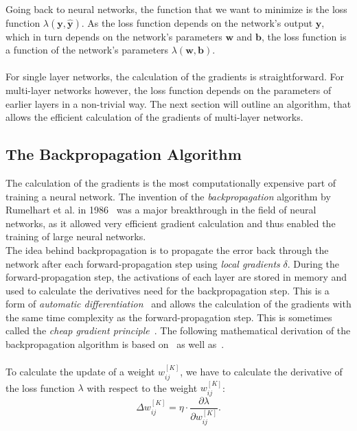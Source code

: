 Going back to neural networks, the function that we want to minimize is the loss function $\lambda(\bm{y}, \bm{\hat{y}})$.
As the loss function depends on the network's output $\bm{y}$, which in turn depends on the network's parameters $\bm{w}$ and $\bm{b}$, the loss function is a function of the network's parameters $\lambda(\bm{w}, \bm{b})$.
\\
\\
For single layer networks, the calculation of the gradients is straightforward.
For multi-layer networks however, the loss function depends on the parameters of earlier layers in a non-trivial way.
The next section will outline an algorithm, that allows the efficient calculation of the gradients of multi-layer networks.

\subsection{The Backpropagation Algorithm}
\label{subsec:backprop}
The calculation of the gradients is the most computationally expensive part of training a neural network.
The invention of the \textit{backpropagation} algorithm by Rumelhart et al. in 1986~\cite{rumelhart_learning_1986} was a major breakthrough in the field of neural networks, as it allowed very efficient gradient calculation and thus enabled the training of large neural networks.
\\
The idea behind backpropagation is to propagate the error back through the network after each forward-propagation step using \textit{local gradients} $\delta$.
During the forward-propagation step, the activations of each layer are stored in memory and used to calculate the derivatives need for the backpropagation step.
This is a form of \textit{automatic differentiation}~\cite{adams_backprop_autodiff_nodate,rall_autodiff_1981} and allows the calculation of the gradients with the same time complexity as the forward-propagation step.
This is sometimes called the \textit{cheap gradient principle}~\cite{griewank_derivatives_2008}.
The following mathematical derivation of the backpropagation algorithm is based on~\cite[chapter 4.4]{haykin_neural_1998} as well as~\cite[chapter 6.5]{goodfellow_deep_2016}.
\\
\\
To calculate the update of a weight $w_{ij}^{[K]}$, we have to calculate the derivative of the loss function $\lambda$ with respect to the weight $w_{ij}^{[K]}$:
\begin{equation}
    \Delta w_{ij}^{[K]} = \eta \cdot \frac{\partial \lambda}{\partial w_{ij}^{[K]}} \text{.}
    \label{eq:weight-derivative} 
\end{equation}
